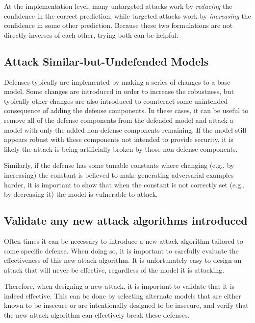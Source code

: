 \documentclass{article} %
\begin{document}
At the implementation level, many untargeted attacks work by \emph{reducing}
the confidence in the correct prediction, while targeted attacks work by
\emph{increasing} the confidence in some other prediction.
%
Because these two formulations are not directly inverses of each other,
trying both can be helpful.

\subsection{Attack Similar-but-Undefended Models}
\label{sec:attacksimilar}

Defenses typically are implemented by making a series of changes
to a base model.
%
Some changes are introduced in order to increase
the robustness, but typically other changes are also introduced to
counteract some unintended consequence of adding the defense components.
%
In these cases, it can be useful to remove all of the defense
components from the defended model and attack a model with only the
added non-defense components remaining.
%
If the model still appears robust with these components not intended
to provide security, it is likely the attack is being artificially
broken by those non-defense components.

Similarly, if the defense has some tunable constants where changing
(e.g., by increasing)
the constant is believed to make generating adversarial examples
harder, it is important to show that when the constant is not
correctly set (e.g., by decreasing it) the model is vulnerable to
attack.

\subsection{Validate any new attack algorithms introduced}
\label{sec:benchmarkattack}

Often times it can be necessary to introduce a new attack algorithm
tailored to some specific defense.
%
When doing so, it is important
to carefully evaluate the effectiveness of this new attack algorithm.
%
It is unfortunately
easy to design an attack that will never be effective, regardless
of the model it is attacking.

Therefore, when designing a new attack, it is important to validate
that it is indeed effective.
%
This can be done by selecting alternate
models that are either known to be insecure or are intentionally
designed to be insecure, and verify that the new attack algorithm
can effectively break these defenses.
\end{document}
